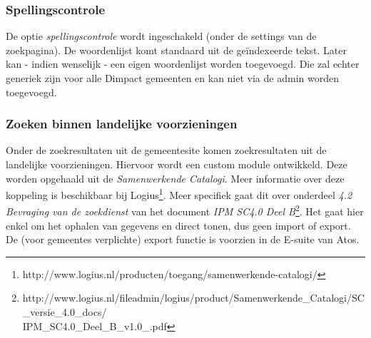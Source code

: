 \subsubsection{Spellingscontrole}
De optie \emph{spellingscontrole} wordt ingeschakeld (onder de settings van de zoekpagina). De woordenlijst komt standaard uit de ge\"{i}ndexeerde tekst. Later kan - indien wenselijk - een eigen woordenlijst worden toegevoegd. Die zal echter generiek zijn voor alle Dimpact gemeenten en kan niet via de admin worden toegevoegd.

\subsubsection{Zoeken binnen landelijke voorzieningen}
Onder de zoekresultaten uit de gemeentesite komen zoekresultaten uit de landelijke voorzieningen. Hiervoor wordt een custom module ontwikkeld. Deze worden opgehaald uit de \emph{Samenwerkende Catalogi}. Meer informatie over deze koppeling is beschikbaar bij Logius\footnote{http://www.logius.nl/producten/toegang/samenwerkende-catalogi/}. Meer specifiek gaat dit over onderdeel \emph{4.2 Bevraging van de zoekdienst} van het document \emph{IPM SC4.0 Deel B}\footnote{http://www.logius.nl/fileadmin/logius/product/Samenwerkende\_Catalogi/SC\_versie\_4.0\_docs/ \\ IPM\_SC4.0\_Deel\_B\_v1.0\_.pdf}. Het gaat hier enkel om het ophalen van gegevens en direct tonen, dus geen import of export. De (voor gemeentes verplichte) export functie is voorzien in de E-suite van Atos.


